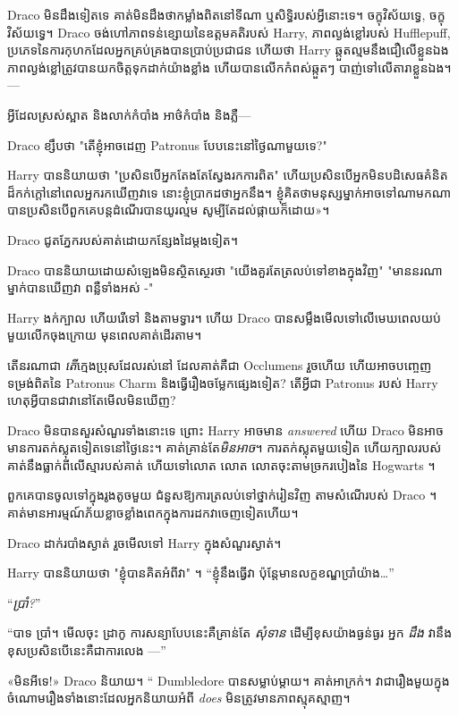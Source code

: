 {{{{{{{{Draco មិន​ដឹង​ទៀត​ទេ គាត់​មិន​ដឹង​ថា​កម្លាំង​ពិត​នៅ​ទីណា ឬ​សិទ្ធិ​របស់​អ្វី​នោះ​ទេ។ ចក្ខុវិស័យទ្វេ, ចក្ខុវិស័យទ្វេ។ Draco ចង់ហៅភាពទន់ខ្សោយនៃឧត្តមគតិរបស់ Harry, ភាពល្ងង់ខ្លៅរបស់ Hufflepuff, ប្រភេទនៃការកុហកដែលអ្នកគ្រប់គ្រងបានប្រាប់ប្រជាជន ហើយថា Harry ឆ្កួតល្មមនឹងជឿលើខ្លួនឯង ភាពល្ងង់ខ្លៅត្រូវបានយកចិត្តទុកដាក់យ៉ាងខ្លាំង ហើយបានលើកកំពស់ឆ្កួតៗ បាញ់ទៅលើតារាខ្លួនឯង។ —

អ្វីដែលស្រស់ស្អាត និងលាក់កំបាំង អាថ៌កំបាំង និងភ្លឺ—

Draco ខ្សឹបថា "តើខ្ញុំអាចដេញ Patronus បែបនេះនៅថ្ងៃណាមួយទេ?"

Harry បាននិយាយថា "ប្រសិនបើអ្នកតែងតែស្វែងរកការពិត" ហើយប្រសិនបើអ្នកមិនបដិសេធគំនិតដ៏កក់ក្តៅនៅពេលអ្នករកឃើញវាទេ នោះខ្ញុំប្រាកដថាអ្នកនឹង។ ខ្ញុំ​គិត​ថា​មនុស្ស​ម្នាក់​អាច​ទៅ​ណា​មក​ណា​បាន​ប្រសិន​បើ​ពួក​គេ​បន្ត​ដំណើរ​បាន​យូរ​ល្មម សូម្បី​តែ​ដល់​ផ្កាយ​ក៏​ដោយ»។

Draco ជូតភ្នែករបស់គាត់ដោយកន្សែងដៃម្តងទៀត។

Draco បាននិយាយដោយសំឡេងមិនស្ថិតស្ថេរថា "យើងគួរតែត្រលប់ទៅខាងក្នុងវិញ" "មាននរណាម្នាក់បានឃើញវា ពន្លឺទាំងអស់ -"

Harry ងក់ក្បាល ហើយរើទៅ និងតាមទ្វារ។ ហើយ Draco បានសម្លឹងមើលទៅលើមេឃពេលយប់មួយលើកចុងក្រោយ មុនពេលគាត់ដើរតាម។

តើនរណាជា \emph{តើ}ក្មេងប្រុសដែលរស់នៅ ដែលគាត់គឺជា Occlumens រួចហើយ ហើយអាចបញ្ចេញទម្រង់ពិតនៃ Patronus Charm និងធ្វើរឿងចម្លែកផ្សេងទៀត? តើអ្វីជា Patronus របស់ Harry ហេតុអ្វីបានជាវានៅតែមើលមិនឃើញ?

Draco មិន​បាន​សួរ​សំណួរ​ទាំង​នោះ​ទេ ព្រោះ Harry អាច​មាន \emph{answered} ហើយ Draco មិន​អាច​មាន​ការ​តក់ស្លុត​ទៀត​ទេ​នៅ​ថ្ងៃ​នេះ។ គាត់គ្រាន់តែ\emph{មិនអាច}។ ការតក់ស្លុតមួយទៀត ហើយក្បាលរបស់គាត់នឹងធ្លាក់ពីលើស្មារបស់គាត់ ហើយទៅលោត លោត លោតចុះតាមច្រករបៀងនៃ Hogwarts ។

\later

ពួកគេបានចូលទៅក្នុងរូងតូចមួយ ជំនួសឱ្យការត្រលប់ទៅថ្នាក់រៀនវិញ តាមសំណើរបស់ Draco ។ គាត់​មាន​អារម្មណ៍​ភ័យ​ខ្លាច​ខ្លាំង​ពេក​ក្នុង​ការ​ដក​វា​ចេញ​ទៀត​ហើយ។

Draco ដាក់​របាំង​ស្ងាត់ រួច​មើល​ទៅ Harry ក្នុង​សំណួរ​ស្ងាត់។

Harry បាននិយាយថា "ខ្ញុំបានគិតអំពីវា" ។ “ខ្ញុំនឹងធ្វើវា ប៉ុន្តែមានលក្ខខណ្ឌប្រាំយ៉ាង…”

“\emph{ប្រាំ?}”

“បាទ ប្រាំ។ មើលចុះ ដ្រាកូ ការសន្យាបែបនេះគឺគ្រាន់តែ \emph{សុំទាន} ដើម្បីខុសយ៉ាងធ្ងន់ធ្ងរ អ្នក \emph{ដឹង} វានឹងខុសប្រសិនបើនេះគឺជាការលេង —”

«មិនអីទេ!» Draco និយាយ។ “ Dumbledore បានសម្លាប់ម្តាយ។ គាត់អាក្រក់។ វា​ជា​រឿង​មួយ​ក្នុង​ចំណោម​រឿង​ទាំង​នោះ​ដែល​អ្នក​និយាយ​អំពី \emph{does} មិន​ត្រូវ​មាន​ភាពស្មុគស្មាញ។

}}}}}}}}
